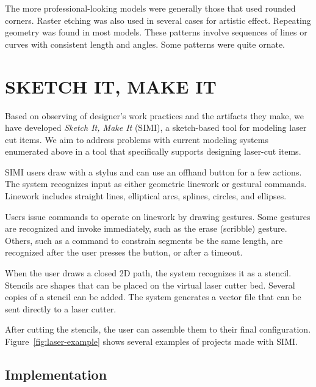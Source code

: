 \documentclass{article}
\begin{document}
The more professional-looking models were generally those that used
rounded corners. Raster etching was also used in several cases for
artistic effect. Repeating geometry was found in most models. These
patterns involve sequences of lines or curves with consistent length
and angles. Some patterns were quite ornate.

\section{SKETCH IT, MAKE IT}

Based on observing of designer's work practices and the artifacts they
make, we have developed \textit{Sketch It, Make It} (SIMI), a
sketch-based tool for modeling laser cut items. We aim to address
problems with current modeling systems enumerated above in a tool that
specifically supports designing laser-cut items.



SIMI users draw with a stylus and can use an offhand button for a few
actions. The system recognizes input as either geometric linework or
gestural commands. Linework includes straight lines, elliptical arcs,
splines, circles, and ellipses. 

Users issue commands to operate on linework by drawing gestures. Some
gestures are recognized and invoke immediately, such as the erase
(scribble) gesture. Others, such as a command to constrain segments be
the same length, are recognized after the user presses the button, or
after a timeout.

When the user draws a closed 2D path, the system recognizes it as a
stencil. Stencils are shapes that can be placed on the virtual laser
cutter bed. Several copies of a stencil can be added. The system
generates a vector file that can be sent directly to a laser cutter.

After cutting the stencils, the user can assemble them to their final
configuration. Figure~\ref{fig:laser-example} shows several examples
of projects made with SIMI.

\subsection{Implementation}
\end{document}

